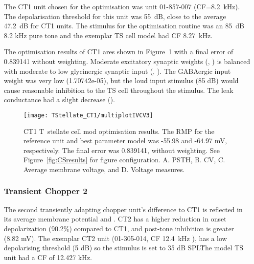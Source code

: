 The CT1 unit chosen for the optimisation was unit 01-857-007 \citep{PaoliniClareyEtAl:2005} (CF=8.2~kHz).
The depolarisation threshold for this unit was 55~dB, close to the average 47.2~dB for CT1 units.
The stimulus for the optimisation routine was an 85~dB 8.2 kHz pure tone and the exemplar TS cell model had CF 8.27~kHz.

The optimisation results of CT1 ares shown in Figure~\ref{fig:CT1results} with a final error of 0.839141 without weighting.
Moderate excitatory synaptic weights (, ) is balanced with moderate to low glycinergic synaptic input (, ).
The GABAergic input weight was very low (\wGLGTS 1.70742e-05), but the loud input stimulus (85 dB) would cause reasonable inhibition to the TS cell throughout the stimulus.
The leak conductance had a slight decrease ().


\begin{figure}[htb]
  \centering
\texttt{[image: TStellate\_CT1/multiplotIVCV3]}
  \caption[CT1 T~stellate Optimisation results]{CT1 T~stellate cell mod optimisation results.
The RMP for the reference unit and best parameter     model was -55.98 and -64.97 mV, respectively.
The final error was 0.839141,     without weighting.
See Figure~\ref{fig:CSresults} for figure configuration.
A. PSTH, B. CV, C. Average membrane voltage, and D. Voltage measures.}
  \label{fig:CT1results}
\end{figure}


\clearpage
\subsubsection{Transient Chopper 2}

The second transiently adapting chopper unit's difference to CT1 is reflected in its average membrane potential and \CV\@.
CT2 has a higher reduction in onset depolarization (90.2\%) compared to CT1, and post-tone inhibition is greater (8.82 mV).
The exemplar CT2 unit (01-305-014, CF 12.4~kHz \citep*{PaoliniClareyEtAl:2005}), has a low depolarising threshold (5 dB) so the stimulus is set to 35 dB SPL\. The model TS unit  had a CF of 12.427 kHz.

